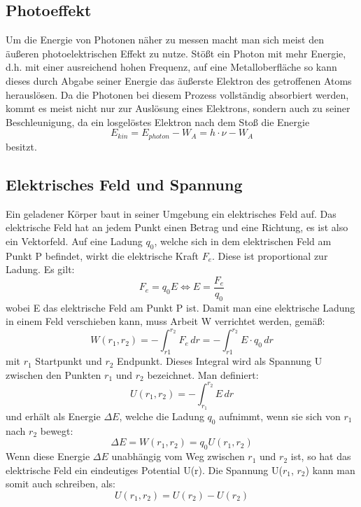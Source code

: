 \documentclass{scrartcl}
\begin{document}
	\subsection{Photoeffekt}
		Um die Energie von Photonen näher zu messen macht man sich meist den äußeren photoelektrischen Effekt zu
		nutze. Stößt ein Photon mit mehr Energie, d.h. mit einer ausreichend hohen Frequenz, auf eine Metalloberfläche
		so kann dieses durch Abgabe seiner Energie das äußerste Elektron des getroffenen Atoms herauslösen. Da die Photonen
		bei diesem Prozess vollständig absorbiert werden, kommt es meist nicht nur zur Auslösung eines Elektrons, sondern 
		auch zu seiner Beschleunigung, da ein losgelöstes Elektron nach dem Stoß die Energie
		\begin{equation}
			E_{kin} = E_{photon} - W_A = h\cdot \nu - W_A
		\end{equation} 
		besitzt.
	\subsection{Elektrisches Feld und Spannung}
		Ein geladener Körper baut in seiner Umgebung ein elektrisches Feld auf. Das elektrische Feld hat an jedem Punkt einen Betrag und eine Richtung, es ist also ein	Vektorfeld. Auf eine Ladung $q_{0}$, welche sich in dem elektrischen Feld am Punkt P befindet, wirkt die elektrische Kraft $F_{e}$. Diese ist proportional zur Ladung. Es gilt:
		\begin{equation}
			F_{e} = q_{0} E   \Leftrightarrow   E = \frac{F_{e}}{q_{0}}
		\end{equation}
		wobei E das elektrische Feld am Punkt P ist. 
		Damit man eine elektrische Ladung in einem Feld verschieben kann, muss Arbeit W verrichtet werden, gemäß:
		\begin{equation}
			W(r_{1}, r_{2}) = - \int_{r{1}}^{r_{2}} F_{e}  \,dr = - \int_{r{1}}^{r_{2}} E \cdot q_0 \,dr
		\end{equation}
		mit $r_{1}$ Startpunkt und $r_{2}$ Endpunkt. 
		Dieses Integral wird als Spannung U zwischen den Punkten $r_{1}$ und $r_{2}$ bezeichnet. Man definiert:
		\begin{equation}
			U(r_{1}, r_{2}) = - \int_{r_{1}}^{r_{2}} E \,dr
		\end{equation}
		und erhält als Energie $\Delta E$, welche die Ladung $q_0$ aufnimmt, wenn sie sich von $r_{1}$ nach $r_{2}$ bewegt:
		\begin{equation}
			\Delta E = W(r_{1}, r_{2}) = q_{0} U(r_{1}, r_{2})
		\end{equation}
		Wenn diese Energie $\Delta E$ unabhängig vom Weg zwischen $r_{1}$ und $r_{2}$ ist, so hat das elektrische Feld ein eindeutiges Potential U(r). Die Spannung U($r_{1}$, $r_{2}$) kann man somit auch schreiben, als:
		\begin{equation}
			U(r_{1}, r_{2}) = U(r_{2}) - U(r_{2})
		\end{equation}
\end{document}
